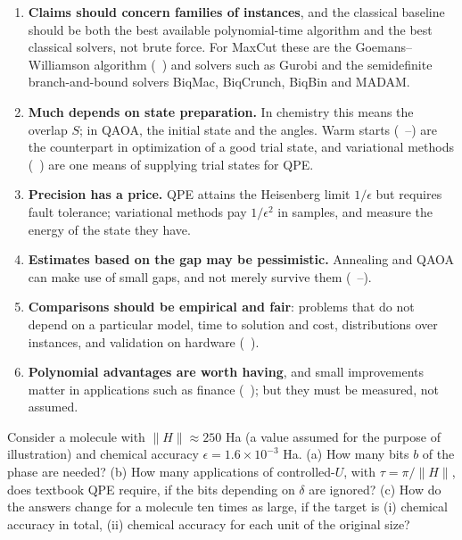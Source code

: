 \documentclass[handoutsbeamer.tex]{subfiles}
\begin{document}
\begin{frame}
\onp{\footnotesize}
\begin{enumerate}\ona{\setlength\itemsep{0.3em}}\onp{\setlength\itemsep{0.1em}}
    \item \textbf{Claims should concern families of instances}, and the classical baseline should be both the best available polynomial-time algorithm and the best classical solvers, not brute force. For MaxCut these are the Goemans--Williamson algorithm (\Chap~) and solvers such as Gurobi and the semidefinite branch-and-bound solvers BiqMac, BiqCrunch, BiqBin and MADAM.
    \item \textbf{Much depends on state preparation.} In chemistry this means the overlap $S$; in QAOA, the initial state and the angles. Warm starts (\Chaps~--) are the counterpart in optimization of a good trial state, and variational methods (\Chap~) are one means of supplying trial states for QPE.
    \item \textbf{Precision has a price.} QPE attains the Heisenberg limit $1/\epsilon$ but requires fault tolerance; variational methods pay $1/\epsilon^2$ in samples, and measure the energy of the state they have.
    \item \textbf{Estimates based on the gap may be pessimistic.} Annealing and QAOA can make use of small gaps, and not merely survive them (\Chaps~--).
    \item \textbf{Comparisons should be empirical and fair}: problems that do not depend on a particular model, time to solution and cost, distributions over instances, and validation on hardware (\Chap~).
    \item \textbf{Polynomial advantages are worth having}, and small improvements matter in applications such as finance (\Chap~); but they must be measured, not assumed.
\end{enumerate}
\end{frame}

\begin{frame}
\begin{exe}
Consider a molecule with $\|H\| \approx 250$ Ha (a value assumed for the purpose of illustration) and chemical accuracy $\epsilon = 1.6\times10^{-3}$ Ha. (a) How many bits $b$ of the phase are needed? (b) How many applications of controlled-$U$, with $\tau = \pi/\|H\|$, does textbook QPE require, if the bits depending on $\delta$ are ignored? (c) How do the answers change for a molecule ten times as large, if the target is (i) chemical accuracy in total, (ii) chemical accuracy for each unit of the original size?
\end{exe}
\end{frame}
\end{document}
